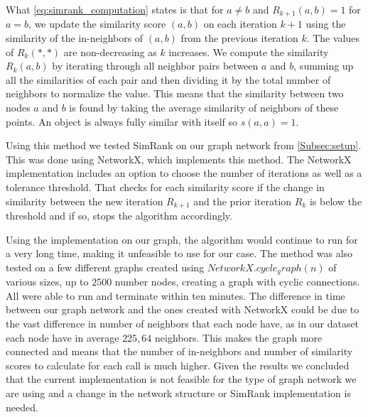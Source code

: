 What \autoref{eq:simrank_computation} states is that for $a \neq b$ and $R_{k+1}(a,b) = 1$ for $a = b$, we update the similarity score $(a,b)$ on each iteration $k+1$ using the similarity of the in-neighbors of $(a,b)$ from the previous iteration $k$. The values of $R_k(*,*)$ are non-decreasing as $k$ increases.
We compute the similarity $R_k(a,b)$ by iterating through all neighbor pairs between $a$ and $b$, summing up all the similarities of each pair and then dividing it by the total number of neighbors to normalize the value.
This means that the similarity between two nodes $a$ and $b$ is found by taking the average similarity of neighbors of these points. An object is always fully similar with itself so $s(a,a) = 1$.

Using this method we tested SimRank on our graph network from \autoref{Subsec:setup}. This was done using NetworkX, which implements this method. The NetworkX implementation includes an option to choose the number of iterations as well as a tolerance threshold. That checks for each similarity score if the change in similarity between the new iteration $R_{k+1}$ and the prior iteration $R_k$ is below the threshold and if so, stops the algorithm accordingly.

Using the implementation on our graph, the algorithm would continue to run for a very long time, making it unfeasible to use for our case. The method was also tested on a few different graphs created using $NetworkX.cycle_graph(n)$ of various sizes, up to $2500$ number nodes, creating a graph with cyclic connections. All were able to run and terminate within ten minutes. The difference in time between our graph network and the ones created with NetworkX could be due to the vast difference in number of neighbors that each node have, as in our dataset each node have in average $225,64$ neighbors. This makes the graph more connected and means that the number of in-neighbors and number of similarity scores to calculate for each call is much higher. Given the results we concluded that the current implementation is not feasible for the type of graph network we are using and a change in the network structure or SimRank implementation is needed.